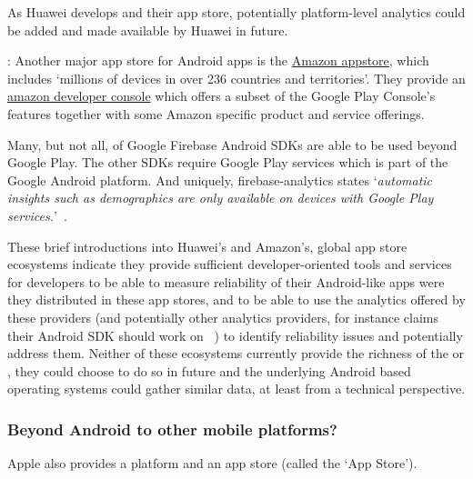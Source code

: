 As Huawei develops  and their app store, potentially platform-level analytics could be added and made available by Huawei in future.

: 
Another major app store for Android apps is the \href{https://developer.amazon.com/apps-and-games}{Amazon appstore}, which includes `millions of devices in over 236 countries and territories'. They provide an \href{https://developer.amazon.com/settings/console/home}{amazon developer console} which offers a subset of the Google Play Console's features together with some Amazon specific product and service offerings. 

Many, but not all, of Google Firebase Android SDKs are able to be used beyond Google Play. The other SDKs require Google Play services which is part of the Google Android platform. And uniquely, firebase-analytics states `\emph{automatic insights such as demographics are only available on devices with Google Play services.}'~. 

These brief introductions into Huawei's and Amazon's, global app store ecosystems indicate they provide sufficient developer-oriented tools and services for developers to be able to measure reliability of their Android-like apps were they distributed in these app stores, and to be able to use the analytics offered by these providers (and potentially other analytics providers, for instance  claims their Android SDK should work on ~) to identify reliability issues and potentially address them. Neither of these ecosystems currently provide the richness of the  or , they could choose to do so in future and the underlying Android based operating systems could gather similar data, at least from a technical perspective.


\subsubsection{Beyond Android to other mobile platforms?}

Apple also provides a platform and an app store (called the `App Store'). 

